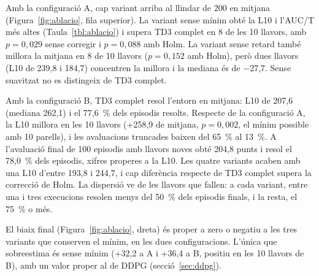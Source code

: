 Amb la configuració A, cap variant arriba al llindar de 200 en mitjana (Figura~\ref{fig:ablacio}, fila superior). La variant sense mínim obté la L10 i l'AUC/T més altes (Taula~\ref{tbl:ablacio}) i supera TD3 complet en 8 de les 10 llavors, amb $p = 0{,}029$ sense corregir i $p = 0{,}088$ amb Holm. La variant sense retard també millora la mitjana en 8 de 10 llavors ($p = 0{,}152$ amb Holm), però dues llavors (L10 de 239,8 i 184,7) concentren la millora i la mediana és de −27,7. Sense suavitzat no es distingeix de TD3 complet.

Amb la configuració B, TD3 complet resol l'entorn en mitjana: L10 de 207,6 (mediana 262,1) i el 77,6~\% dels episodis resolts. Respecte de la configuració A, la L10 millora en les 10 llavors (+258,9 de mitjana, $p = 0{,}002$, el mínim possible amb 10 parells), i les avaluacions truncades baixen del 65~\% al 13~\%. A l'avaluació final de 100 episodis amb llavors noves obté 204,8 punts i resol el 78,0~\% dels episodis, xifres properes a la L10. Les quatre variants acaben amb una L10 d'entre 193,8 i 244,7, i cap diferència respecte de TD3 complet supera la correcció de Holm. La dispersió ve de les llavors que fallen: a cada variant, entre una i tres execucions resolen menys del 50~\% dels episodis finals, i la resta, el 75~\% o més.

El biaix final (Figura~\ref{fig:ablacio}, dreta) és proper a zero o negatiu a les tres variants que conserven el mínim, en les dues configuracions. L'única que sobreestima és sense mínim (+32,2 a A i +36,4 a B, positiu en les 10 llavors de B), amb un valor proper al de DDPG (secció~\ref{sec:ddpg}).
